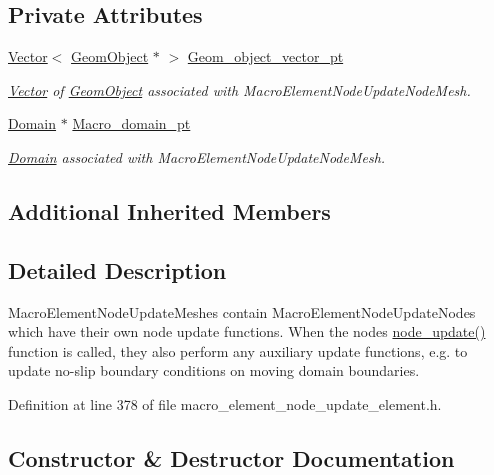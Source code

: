 \subsection*{Private Attributes}
\begin{DoxyCompactItemize}
\item 
\hyperlink{classoomph_1_1Vector}{Vector}$<$ \hyperlink{classoomph_1_1GeomObject}{Geom\+Object} $\ast$ $>$ \hyperlink{classoomph_1_1MacroElementNodeUpdateMesh_a146f87e49ea72db49c94fa5295d39a46}{Geom\+\_\+object\+\_\+vector\+\_\+pt}
\begin{DoxyCompactList}\small\item\em \hyperlink{classoomph_1_1Vector}{Vector} of \hyperlink{classoomph_1_1GeomObject}{Geom\+Object} associated with Macro\+Element\+Node\+Update\+Node\+Mesh. \end{DoxyCompactList}\item 
\hyperlink{classoomph_1_1Domain}{Domain} $\ast$ \hyperlink{classoomph_1_1MacroElementNodeUpdateMesh_a27a421ccba8fb0d180f3250da82b2a15}{Macro\+\_\+domain\+\_\+pt}
\begin{DoxyCompactList}\small\item\em \hyperlink{classoomph_1_1Domain}{Domain} associated with Macro\+Element\+Node\+Update\+Node\+Mesh. \end{DoxyCompactList}\end{DoxyCompactItemize}
\subsection*{Additional Inherited Members}


\subsection{Detailed Description}
Macro\+Element\+Node\+Update\+Meshes contain Macro\+Element\+Node\+Update\+Nodes which have their own node update functions. When the node\textquotesingle{}s \hyperlink{classoomph_1_1MacroElementNodeUpdateMesh_ab5271c4514bcd236271307361423ac9d}{node\+\_\+update()} function is called, they also perform any auxiliary update functions, e.\+g. to update no-\/slip boundary conditions on moving domain boundaries. 

Definition at line 378 of file macro\+\_\+element\+\_\+node\+\_\+update\+\_\+element.\+h.



\subsection{Constructor \& Destructor Documentation}
\mbox{\label{classoomph_1_1MacroElementNodeUpdateMesh_a6ef7edc84ad3427fed02c958a8cf76e1}} 

